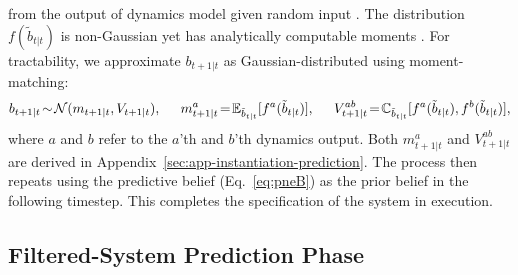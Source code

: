 \documentclass{article}
\newcommand{\N}{\mathcal{N}}
\newcommand{\C}{{\mathbb C}}
\newcommand{\E}{{\mathbb E}}
\newcommand{\unot}[1]{\tilde #1_{t|t}}     %
\newcommand{\pne}[1]{#1_{t+1|t}}   %
\newcommand{\fb}{f} %
\newcommand{\bm}{m} %
\begin{document}
from the output of dynamics model \smash{$\fb$} given random input \smash{$\unot{b}$}.
The distribution $\fb(\unot{b})$ is non-Gaussian
yet has analytically computable moments \cite{pilco}.
For tractability, we approximate $\pne{b}$ as Gaussian-distributed using moment-matching:
\begin{equation}
\pne{b}\!\sim\!\N(\pne{\bm},\pne{V}),\label{eq:pneB}\hspace{5mm}
\pne{\bm}^a\!=\!\E_{\unot{b}}[\fb^a(\unot{b})],\hspace{5mm}
\pne{V}^{ab}\!=\!\C_{\unot{b}}[\fb^a(\unot{b}),\fb^b(\unot{b})],
\end{equation}
where $a$ and $b$ refer to the $a$'th and $b$'th dynamics output.
Both $\pne{\bm}^a$ and $\pne{V}^{ab}$ are derived in Appendix~\ref{sec:app-instantiation-prediction}.
The
process then repeats
using the predictive belief (Eq.~\ref{eq:pneB})
as the prior belief in the following timestep.
This completes the specification of the system in execution.

\subsection{Filtered-System Prediction Phase}\label{sec:filtered-prediction}
\end{document}

